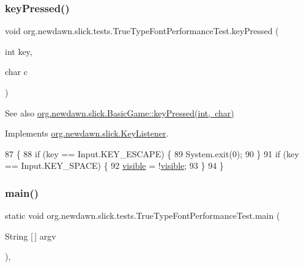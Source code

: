 \subsubsection{\texorpdfstring{key\+Pressed()}{keyPressed()}}
{\footnotesize\ttfamily void org.\+newdawn.\+slick.\+tests.\+True\+Type\+Font\+Performance\+Test.\+key\+Pressed (\begin{DoxyParamCaption}\item[{int}]{key,  }\item[{char}]{c }\end{DoxyParamCaption})\hspace{0.3cm}{\ttfamily [inline]}}

\begin{DoxySeeAlso}{See also}
\mbox{\hyperlink{classorg_1_1newdawn_1_1slick_1_1_basic_game_a4fbb3345b5abf5ddd54a99466d07f02f}{org.\+newdawn.\+slick.\+Basic\+Game\+::key\+Pressed(int, char)}} 
\end{DoxySeeAlso}


Implements \mbox{\hyperlink{interfaceorg_1_1newdawn_1_1slick_1_1_key_listener_ac0b0568a21ef486c4f51382614c196ef}{org.\+newdawn.\+slick.\+Key\+Listener}}.


\begin{DoxyCode}
87                                             \{
88         \textcolor{keywordflow}{if} (key == Input.KEY\_ESCAPE) \{
89             System.exit(0);
90         \}
91         \textcolor{keywordflow}{if} (key == Input.KEY\_SPACE) \{
92             \mbox{\hyperlink{classorg_1_1newdawn_1_1slick_1_1tests_1_1_true_type_font_performance_test_aff78102bb4082a1dd8e34dc6152a51b2}{visible}} = !\mbox{\hyperlink{classorg_1_1newdawn_1_1slick_1_1tests_1_1_true_type_font_performance_test_aff78102bb4082a1dd8e34dc6152a51b2}{visible}};
93         \}
94     \}
\end{DoxyCode}
\mbox{\label{classorg_1_1newdawn_1_1slick_1_1tests_1_1_true_type_font_performance_test_a659622d290bb7e7ba15992c36adde880}} 
\subsubsection{\texorpdfstring{main()}{main()}}
{\footnotesize\ttfamily static void org.\+newdawn.\+slick.\+tests.\+True\+Type\+Font\+Performance\+Test.\+main (\begin{DoxyParamCaption}\item[{String \mbox{[}$\,$\mbox{]}}]{argv }\end{DoxyParamCaption})\hspace{0.3cm}{\ttfamily [inline]}, {\ttfamily [static]}}

